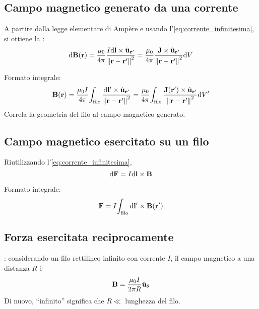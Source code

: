 \subsection{Campo magnetico generato da una corrente}

A partire dalla legge elementare di Ampère e usando l'\cref{eq:corrente_infinitesima}, si ottiene la :
\begin{equation}
\label{eq:ampere_laplace}
    \mathrm{d}\mathbf{B}(\mathbf{r}) = \frac{\mu_0}{4\pi} \frac{I \mathrm{d} \mathbf{l} \times \hat{\mathbf{u}}_{\mathbf{r}'}}{\left\lVert \mathbf{r} -\mathbf{r}' \right\rVert^2}
    = \frac{\mu_0}{4\pi} \frac{\mathbf{J} \times \hat{\mathbf{u}}_{\mathbf{r}'}}{\left\lVert \mathbf{r} -\mathbf{r}' \right\rVert^2} \mathrm{d} V
\end{equation}

Formato integrale:
\begin{equation}
\label{eq:ampere_laplace_integrale}
    \mathbf{B}(\mathbf{r}) = \frac{\mu_0 I}{4\pi} \!\int_\text{filo} \frac{\mathrm{d} \mathbf{l}' \times \hat{\mathbf{u}}_{\mathbf{r}'}}{\left\lVert \mathbf{r} -\mathbf{r}' \right\rVert^2}
    = \frac{\mu_0}{4\pi} \!\int_\text{filo} \frac{\mathbf{J}(\mathbf{r}') \times \hat{\mathbf{u}}_{\mathbf{r}'}}{\left\lVert \mathbf{r} -\mathbf{r}' \right\rVert^2} \mathrm{d} V'
\end{equation}
Correla la geometria del filo al campo magnetico generato.

\subsection{Campo magnetico esercitato su un filo}

Riutilizzando l'\cref{eq:corrente_infinitesima},
\begin{equation}
    \mathrm{d}\mathbf{F} = I \mathrm{d}\mathbf{l} \times \mathbf{B}
\end{equation}

Formato integrale:
\begin{equation}
    \mathbf{F} = I\!\int_\text{filo} \mathrm{d}\mathbf{l}' \times \mathbf{B}(\mathbf{r}')
\end{equation}

\subsection{Forza esercitata reciprocamente}
\label{sec:def_ampere}


: considerando un filo rettilineo infinito con corrente $I$, il campo magnetico a una distanza $R$ è
\begin{equation}
\label{eq:biot_savart}
    \mathbf{B} = \frac{\mu_0 I}{2\pi R} \hat{\mathbf{u}}_{\theta}
\end{equation}
Di nuovo, ``infinito'' significa che $R \ll$ lunghezza del filo.

